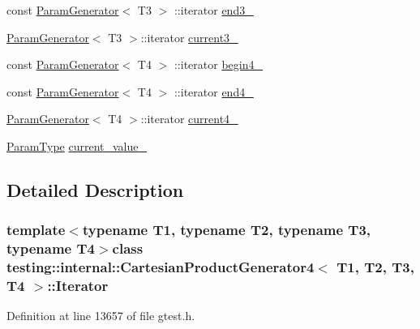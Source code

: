 \begin{DoxyCompactItemize}
\item 
const \hyperlink{classtesting_1_1internal_1_1ParamGenerator}{\-Param\-Generator}$<$ \-T3 $>$\*
\-::iterator \hyperlink{classtesting_1_1internal_1_1CartesianProductGenerator4_1_1Iterator_a41f5fcf2148ca9237a3157b3cb8599b4}{end3\-\_\-}
\item 
\hyperlink{classtesting_1_1internal_1_1ParamGenerator}{\-Param\-Generator}$<$ \-T3 $>$\-::iterator \hyperlink{classtesting_1_1internal_1_1CartesianProductGenerator4_1_1Iterator_aebedcdf0a5114a1e4e9fc9bdc6ae4ff1}{current3\-\_\-}
\item 
const \hyperlink{classtesting_1_1internal_1_1ParamGenerator}{\-Param\-Generator}$<$ \-T4 $>$\*
\-::iterator \hyperlink{classtesting_1_1internal_1_1CartesianProductGenerator4_1_1Iterator_a0fdeb2c1ac69631ac7174fb09f4416ae}{begin4\-\_\-}
\item 
const \hyperlink{classtesting_1_1internal_1_1ParamGenerator}{\-Param\-Generator}$<$ \-T4 $>$\*
\-::iterator \hyperlink{classtesting_1_1internal_1_1CartesianProductGenerator4_1_1Iterator_a22d11bcaecba58d3423394477b7f309b}{end4\-\_\-}
\item 
\hyperlink{classtesting_1_1internal_1_1ParamGenerator}{\-Param\-Generator}$<$ \-T4 $>$\-::iterator \hyperlink{classtesting_1_1internal_1_1CartesianProductGenerator4_1_1Iterator_a2a2265421d191a086c0e2f6142814643}{current4\-\_\-}
\item 
\hyperlink{classtesting_1_1internal_1_1CartesianProductGenerator4_a99c0f82cb1095cf66d28100490e9fa39}{\-Param\-Type} \hyperlink{classtesting_1_1internal_1_1CartesianProductGenerator4_1_1Iterator_a1b76a85d1482a16a96efc293e8384512}{current\-\_\-value\-\_\-}
\end{DoxyCompactItemize}


\subsection{\-Detailed \-Description}
\subsubsection*{template$<$typename T1, typename T2, typename T3, typename T4$>$class testing\-::internal\-::\-Cartesian\-Product\-Generator4$<$ T1, T2, T3, T4 $>$\-::\-Iterator}



\-Definition at line 13657 of file gtest.\-h.



